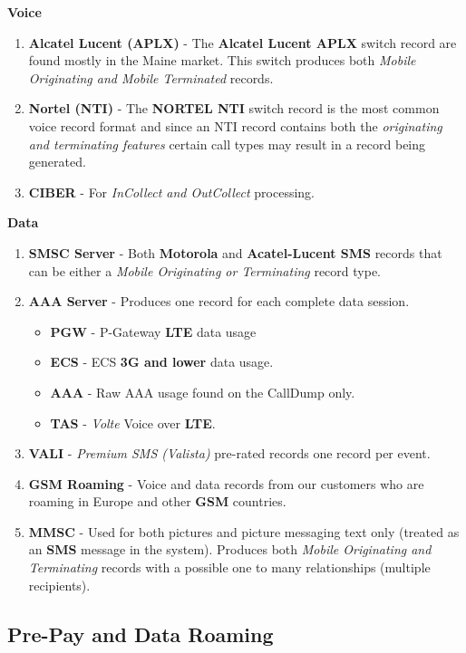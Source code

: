 \documentclass[12pt,twoside]{article}
\begin{document}
\textbf{Voice}
\begin{enumerate}
\item \textbf{Alcatel Lucent (APLX)} - The \textbf{Alcatel Lucent APLX} switch record
are found mostly in the Maine market. This switch produces both
\emph{Mobile Originating and Mobile Terminated} records.
\item \textbf{Nortel (NTI)} - The \textbf{NORTEL NTI} switch record is the most common
voice record format and since an NTI record contains both the
\emph{originating and terminating features} certain call types may
result in a record being generated.
\item \textbf{CIBER} - For \emph{InCollect and OutCollect} processing.\\
\end{enumerate}

\textbf{Data}
\begin{enumerate}
\item \textbf{SMSC Server} - Both \textbf{Motorola} and \textbf{Acatel-Lucent SMS} records
that can be either a \emph{Mobile Originating or Terminating} record
type.
\item \textbf{AAA Server} - Produces one record for each complete data session.
\begin{itemize}
\item \textbf{PGW} - P-Gateway \textbf{LTE} data usage
\item \textbf{ECS} - ECS \textbf{3G and lower} data usage.
\item \textbf{AAA} - Raw AAA usage found on the CallDump only.
\item \textbf{TAS} - \emph{Volte} Voice over \textbf{LTE}.
\end{itemize}
\item \textbf{VALI} - \emph{Premium SMS (Valista)} pre-rated records one record per
event.
\item \textbf{GSM Roaming} - Voice and data records from our customers who are
roaming in Europe and other \textbf{GSM} countries.
\item \textbf{MMSC} - Used for both pictures and picture messaging text only
(treated as an \textbf{SMS} message in the system). Produces both \emph{Mobile
Originating and Terminating} records with a possible one to many
relationships (multiple recipients).\\
\end{enumerate}

\subsection{Pre-Pay and Data Roaming}
\label{sec:orgheadline17}
\end{document}
